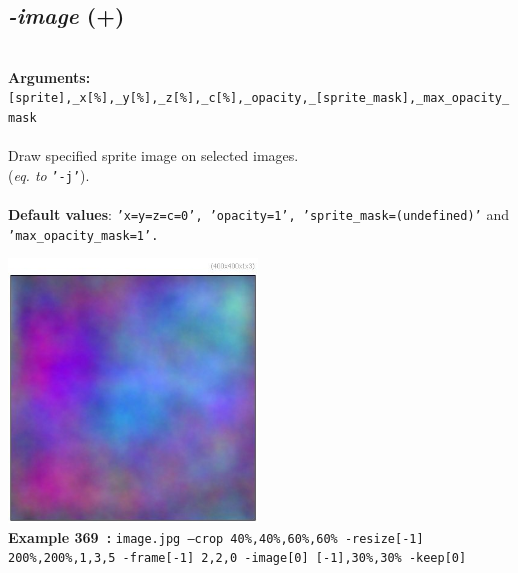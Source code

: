 \documentclass[a4paper,11pt,twoside]{book}
\begin{document}
\subsection{\emph{-image} (+)}\vspace*{-0.5em}
~\\\textbf{Arguments: } 
{\small \texttt{[sprite],\_x[\%],\_y[\%],\_z[\%],\_c[\%],\_opacity,\_[sprite\_mask],\_max\_opacity\_mask}}\\~\\
Draw specified sprite image on selected images.
~\\(\emph{eq. to} {\small \texttt{'-j'}}).
~\\~\\\textbf{Default values}: {\small \texttt{'x=y=z=c=0', 'opacity=1', 'sprite\_mask=(undefined)'} and \texttt{'max\_opacity\_mask=1'.}}
\begin{center}\includegraphics[keepaspectratio=true,height=7cm,width=\textwidth]{img/gmic_def369.jpg}\\
{\footnotesize \textbf{Example 369~:} \texttt{image.jpg --crop 40\%,40\%,60\%,60\% -resize[-1] 200\%,200\%,1,3,5 -frame[-1] 2,2,0 -image[0] [-1],30\%,30\% -keep[0]}}
\end{center}
\end{document}
